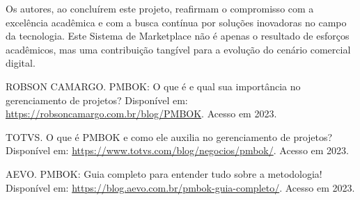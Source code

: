 \documentclass[
	12pt,				%
	openright,			%
	twoside,			%
	a4paper,			%
	english,			%
	brazil				%
	]{abntex2}
\begin{document}
Os autores, ao concluírem este projeto, reafirmam o compromisso com a excelência acadêmica e com a busca contínua por soluções inovadoras no campo da tecnologia. Este Sistema de Marketplace não é apenas o resultado de esforços acadêmicos, mas uma contribuição tangível para a evolução do cenário comercial digital.

\begin{thebibliography}{99}
    
    ROBSON CAMARGO. PMBOK: O que é e qual sua importância no gerenciamento de projetos? Disponível em: \url{https://robsoncamargo.com.br/blog/PMBOK}. Acesso em 2023.

    TOTVS. O que é PMBOK e como ele auxilia no gerenciamento de projetos? Disponível em: \url{https://www.totvs.com/blog/negocios/pmbok/}. Acesso em 2023.

    AEVO. PMBOK: Guia completo para entender tudo sobre a metodologia! Disponível em: \url{https://blog.aevo.com.br/pmbok-guia-completo/}. Acesso em 2023.

\end{thebibliography}

\printindex
\end{document}
